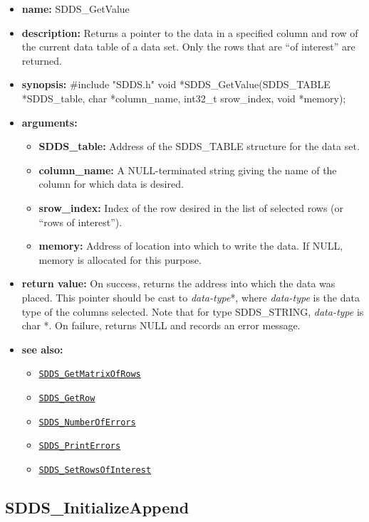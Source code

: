 \documentclass[11pt]{article}
\newcommand{\progref}[1]{\hyperref[SDDS_#1]{\tt SDDS\_#1}}
\begin{document}
\begin{itemize}
\item {\bf name:}\newline
SDDS\_GetValue
\item {\bf description:}\newline
Returns a pointer to the data in a specified column and row of the current data table of a data set. Only the rows that are ``of interest'' are returned.
\item {\bf synopsis:} \#include "SDDS.h"\newline
void *SDDS\_GetValue(SDDS\_TABLE *SDDS\_table, char *column\_name, int32\_t srow\_index, void *memory);
\item {\bf arguments:}
\begin{itemize}
\item {\bf SDDS\_table:} Address of the SDDS\_TABLE structure for the data set.
\item {\bf column\_name:} A NULL-terminated string giving the name of the column for which data is desired.
\item {\bf srow\_index:} Index of the row desired in the list of selected rows (or ``rows of interest'').
\item {\bf memory:} Address of location into which to write the data. If NULL, memory is allocated for this purpose.
\end{itemize}
\item {\bf return value:}\newline
On success, returns the address into which the data was placed. This pointer should be cast to {\em data-type}*, where {\em data-type} is the data type of the columns selected. Note that for type SDDS\_STRING, {\em data-type} is char *.\newline
\newline
On failure, returns NULL and records an error message. 
\item {\bf see also:}
\begin{itemize}
\item \progref{GetMatrixOfRows}
\item \progref{GetRow}
\item \progref{NumberOfErrors}
\item \progref{PrintErrors}
\item \progref{SetRowsOfInterest}
\end{itemize}
\end{itemize}

\subsection{SDDS\_InitializeAppend}
\label{SDDS_InitializeAppend}
\end{document}
